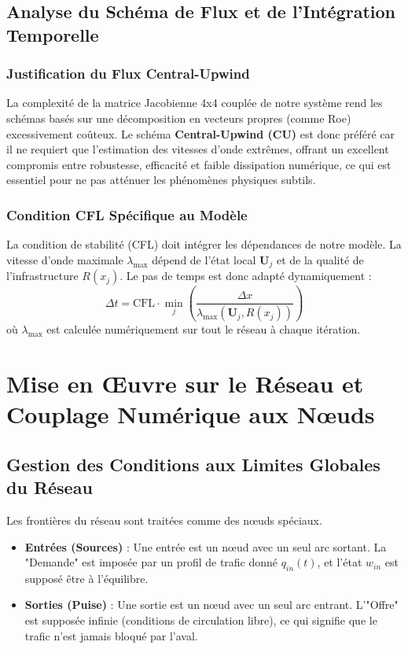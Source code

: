 \subsection{Analyse du Schéma de Flux et de l'Intégration Temporelle}

\subsubsection{Justification du Flux Central-Upwind}
La complexité de la matrice Jacobienne 4x4 couplée de notre système rend les schémas basés sur une décomposition en vecteurs propres (comme Roe) excessivement coûteux. Le schéma \textbf{Central-Upwind (CU)} est donc préféré car il ne requiert que l'estimation des vitesses d'onde extrêmes, offrant un excellent compromis entre robustesse, efficacité et faible dissipation numérique, ce qui est essentiel pour ne pas atténuer les phénomènes physiques subtils.

\subsubsection{Condition CFL Spécifique au Modèle}
La condition de stabilité (CFL) doit intégrer les dépendances de notre modèle. La vitesse d'onde maximale $\lambda_{\max}$ dépend de l'état local $\mathbf{U}_j$ et de la qualité de l'infrastructure $R(x_j)$. Le pas de temps est donc adapté dynamiquement :
\[ \Delta t = \text{CFL} \cdot \min_{j} \left( \frac{\Delta x}{\lambda_{\max}(\mathbf{U}_j, R(x_j))} \right) \]
où $\lambda_{\max}$ est calculée numériquement sur tout le réseau à chaque itération.

\section{Mise en Œuvre sur le Réseau et Couplage Numérique aux Nœuds}

\subsection{Gestion des Conditions aux Limites Globales du Réseau}
Les frontières du réseau sont traitées comme des nœuds spéciaux.
\begin{itemize}
    \item \textbf{Entrées (Sources)} : Une entrée est un nœud avec un seul arc sortant. La "Demande" est imposée par un profil de trafic donné $q_{in}(t)$, et l'état $w_{in}$ est supposé être à l'équilibre.
    \item \textbf{Sorties (Puise)} : Une sortie est un nœud avec un seul arc entrant. L'"Offre" est supposée infinie (conditions de circulation libre), ce qui signifie que le trafic n'est jamais bloqué par l'aval.
\end{itemize}

